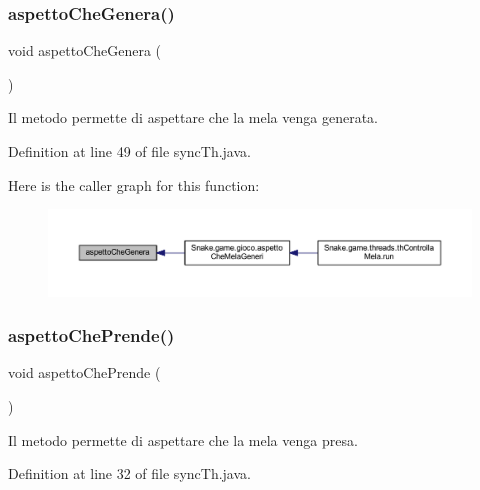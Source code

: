 \subsubsection{\texorpdfstring{aspetto\+Che\+Genera()}{aspettoCheGenera()}}
{\footnotesize\ttfamily void aspetto\+Che\+Genera (\begin{DoxyParamCaption}{ }\end{DoxyParamCaption})}



Il metodo permette di aspettare che la mela venga generata. 



Definition at line 49 of file sync\+Th.\+java.

Here is the caller graph for this function\+:
\nopagebreak
\begin{figure}[H]
\begin{center}
\leavevmode
\includegraphics[width=350pt]{class_snake_1_1game_1_1utility_1_1sync_th_a1fb318d4f1722f999b5af474befc8b67_icgraph}
\end{center}
\end{figure}
\mbox{\label{class_snake_1_1game_1_1utility_1_1sync_th_a8e454b3430022fcccd7ecf338441c1bf}} 
\subsubsection{\texorpdfstring{aspetto\+Che\+Prende()}{aspettoChePrende()}}
{\footnotesize\ttfamily void aspetto\+Che\+Prende (\begin{DoxyParamCaption}{ }\end{DoxyParamCaption})}



Il metodo permette di aspettare che la mela venga presa. 



Definition at line 32 of file sync\+Th.\+java.

